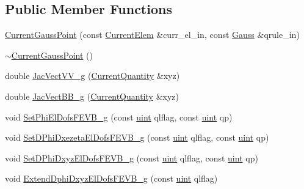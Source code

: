 \subsection*{Public Member Functions}
\begin{DoxyCompactItemize}
\item 
\mbox{\hyperlink{classfemus_1_1_current_gauss_point_ae55cfed8afa742359466fe1f21b10b02}{Current\+Gauss\+Point}} (const \mbox{\hyperlink{classfemus_1_1_current_elem}{Current\+Elem}} \&curr\+\_\+el\+\_\+in, const \mbox{\hyperlink{classfemus_1_1_gauss}{Gauss}} \&qrule\+\_\+in)
\item 
\mbox{\hyperlink{classfemus_1_1_current_gauss_point_a54541c2150b3c273354682ee31e5025d}{$\sim$\+Current\+Gauss\+Point}} ()
\item 
double \mbox{\hyperlink{classfemus_1_1_current_gauss_point_a96a47ebb8abd928f0db6e472db2811f1}{Jac\+Vect\+V\+V\+\_\+g}} (\mbox{\hyperlink{classfemus_1_1_current_quantity}{Current\+Quantity}} \&xyz)
\item 
double \mbox{\hyperlink{classfemus_1_1_current_gauss_point_afa303733709a133cb86ba65fe70d4a31}{Jac\+Vect\+B\+B\+\_\+g}} (\mbox{\hyperlink{classfemus_1_1_current_quantity}{Current\+Quantity}} \&xyz)
\item 
void \mbox{\hyperlink{classfemus_1_1_current_gauss_point_a7a11e1164802fdc683726eea6123d99f}{Set\+Phi\+El\+Dofs\+F\+E\+V\+B\+\_\+g}} (const \mbox{\hyperlink{_typedefs_8hpp_a91ad9478d81a7aaf2593e8d9c3d06a14}{uint}} qlflag, const \mbox{\hyperlink{_typedefs_8hpp_a91ad9478d81a7aaf2593e8d9c3d06a14}{uint}} qp)
\item 
void \mbox{\hyperlink{classfemus_1_1_current_gauss_point_a5b7c118fc9376db8783714992e341891}{Set\+D\+Phi\+Dxezeta\+El\+Dofs\+F\+E\+V\+B\+\_\+g}} (const \mbox{\hyperlink{_typedefs_8hpp_a91ad9478d81a7aaf2593e8d9c3d06a14}{uint}} qlflag, const \mbox{\hyperlink{_typedefs_8hpp_a91ad9478d81a7aaf2593e8d9c3d06a14}{uint}} qp)
\item 
void \mbox{\hyperlink{classfemus_1_1_current_gauss_point_af33ae0e6b36353be0bb671573c6362bc}{Set\+D\+Phi\+Dxyz\+El\+Dofs\+F\+E\+V\+B\+\_\+g}} (const \mbox{\hyperlink{_typedefs_8hpp_a91ad9478d81a7aaf2593e8d9c3d06a14}{uint}} qlflag, const \mbox{\hyperlink{_typedefs_8hpp_a91ad9478d81a7aaf2593e8d9c3d06a14}{uint}} qp)
\item 
void \mbox{\hyperlink{classfemus_1_1_current_gauss_point_aff8e672a0e763e7ff73a1e06a7bc5143}{Extend\+Dphi\+Dxyz\+El\+Dofs\+F\+E\+V\+B\+\_\+g}} (const \mbox{\hyperlink{_typedefs_8hpp_a91ad9478d81a7aaf2593e8d9c3d06a14}{uint}} qlflag)
\end{DoxyCompactItemize}

